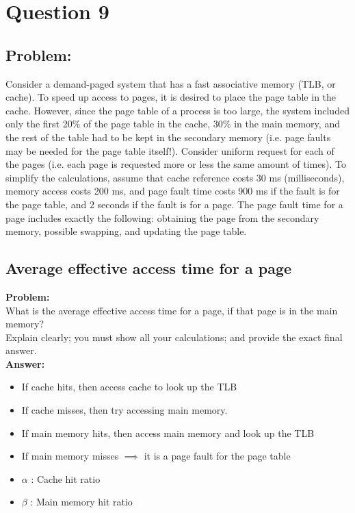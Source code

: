 \newpage
\section{Question 9}

\subsection{Problem:}
Consider a demand-paged system that has a fast associative memory (TLB, or cache). To speed up access
to pages, it is desired to place the page table in the cache. However, since the page table of a process is
too large, the system included only the first 20\% of the page table in the cache, 30\% in the main memory,
and the rest of the table had to be kept in the secondary memory (i.e. page faults may be needed for the
page table itself!). Consider uniform request for each of the pages (i.e. each page is requested more or less
the same amount of times). To simplify the calculations, assume that cache reference costs 30 ms
(milliseconds), memory access costs 200 ms, and page fault time costs 900 ms if the fault is for the page
table, and 2 seconds if the fault is for a page. The page fault time for a page includes exactly the following:
obtaining the page from the secondary memory, possible swapping, and updating the page table. 

\subsection{Average effective access time for a page}
\textbf{Problem:} \\
What is the average effective access time for a page, if that page is in the main memory? \\
Explain clearly; you must show all your calculations; and provide the exact final answer. \\

\textbf{Answer:} \\

\begin{itemize}
    \item If cache hits, then access cache to look up the TLB 
    \item If cache misses, then try accessing main memory. 
    \item If main memory hits, then access main memory and look up the TLB
    \item If main memory misses $\implies$ it is a page fault for the page table
    \item $\alpha$ : Cache hit ratio
    \item $\beta$ : Main memory hit ratio

\end{itemize}

